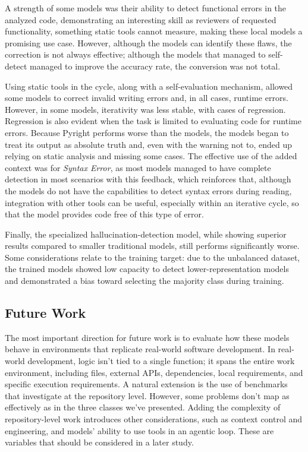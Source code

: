 A strength of some models was their ability to detect functional errors in the analyzed code, demonstrating an interesting skill as reviewers of requested functionality, something static tools cannot measure, making these local models a promising use case. However, although the models can identify these flaws, the correction is not always effective; although the models that managed to self-detect managed to improve the accuracy rate, the conversion was not total.

Using static tools in the cycle, along with a self-evaluation mechanism, allowed some models to correct invalid writing errors and, in all cases, runtime errors. However, in some models, iterativity was less stable, with cases of regression. Regression is also evident when the task is limited to evaluating code for runtime errors. Because Pyright performs worse than the models, the models began to treat its output as absolute truth and, even with the warning not to, ended up relying on static analysis and missing some cases. The effective use of the added context was for \emph{Syntax Error}, as most models managed to have complete detection in most scenarios with this feedback, which reinforces that, although the models do not have the capabilities to detect syntax errors during reading, integration with other tools can be useful, especially within an iterative cycle, so that the model provides code free of this type of error.

Finally, the specialized hallucination-detection model, while showing superior results compared to smaller traditional models, still performs significantly worse. Some considerations relate to the training target: due to the unbalanced dataset, the trained models showed low capacity to detect lower-representation models and demonstrated a bias toward selecting the majority class during training.

\subsection{Future Work}

The most important direction for future work is to evaluate how these models behave in environments that replicate real-world software development. In real-world development, logic isn't tied to a single function; it spans the entire work environment, including files, external APIs, dependencies, local requirements, and specific execution requirements. A natural extension is the use of benchmarks that investigate at the repository level. However, some problems don't map as effectively as in the three classes we've presented. Adding the complexity of repository-level work introduces other considerations, such as context control and engineering, and models' ability to use tools in an agentic loop. These are variables that should be considered in a later study.

